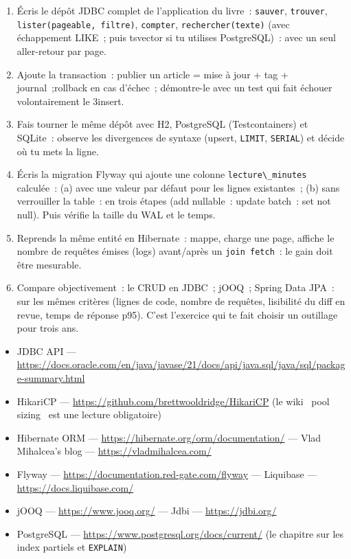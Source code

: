 \documentclass[12pt,a4paper,twoside,openright]{book}
\begin{document}
\begin{exercice}
\begin{enumerate}
  \item \'Ecris le d\'ep\^ot JDBC complet de l'application du livre~: \verb|sauver|, \verb|trouver|,
        \verb|lister(pageable, filtre)|, \verb|compter|, \verb|rechercher(texte)| (avec \'echappement
        LIKE~; puis tsvector si tu utilises PostgreSQL)~: avec un seul aller-retour par page.
  \item Ajoute la transaction~: publier un article = mise \`a jour + tag + journal~;rollback en cas
        d'\'echec~; d\'emontre-le avec un test qui fait \'echouer volontairement le 3\ieme insert.
  \item Fais tourner le m\^eme d\'ep\^ot avec H2, PostgreSQL (Testcontainers) et SQLite~: observe les
        divergences de syntaxe (upsert, \verb|LIMIT|, \verb|SERIAL|) et d\'ecide o\`u tu mets la ligne.
  \item \'Ecris la migration Flyway qui ajoute une colonne \verb|lecture\_minutes| calcul\'ee~: (a) avec
        une valeur par d\'efaut pour les lignes existantes~; (b) sans verrouiller la table~: en trois
        \'etapes (add nullable~: update batch~: set not null). Puis v\'erifie la taille du WAL et le temps.
  \item Reprends la m\^eme entit\'e en Hibernate~: mappe, charge une page, affiche le nombre de
        requ\^etes \'emises (logs) avant/apr\`es un \verb|join fetch|~: le gain doit \^etre mesurable.
  \item Compare objectivement~: le CRUD en JDBC~; jOOQ~; Spring Data JPA~: sur les m\^emes crit\`eres
        (lignes de code, nombre de requ\^etes, lisibilit\'e du diff en revue, temps de r\'eponse p95).
        C'est l'exercice qui te fait choisir un outillage pour trois ans.
\end{enumerate}
\end{exercice}

\begin{ressources}
\begin{itemize}
  \item JDBC API --- \url{https://docs.oracle.com/en/java/javase/21/docs/api/java.sql/java/sql/package-summary.html}
  \item HikariCP --- \url{https://github.com/brettwooldridge/HikariCP} (le wiki \og ~pool sizing~ \fg{} est une lecture obligatoire)
  \item Hibernate ORM --- \url{https://hibernate.org/orm/documentation/} --- Vlad Mihalcea's blog --- \url{https://vladmihalcea.com/}
  \item Flyway --- \url{https://documentation.red-gate.com/flyway} --- Liquibase --- \url{https://docs.liquibase.com/}
  \item jOOQ --- \url{https://www.jooq.org/} --- Jdbi --- \url{https://jdbi.org/}
  \item PostgreSQL --- \url{https://www.postgresql.org/docs/current/} (le chapitre sur les index partiels et \verb|EXPLAIN|)
\end{itemize}
\end{ressources}
\end{document}
